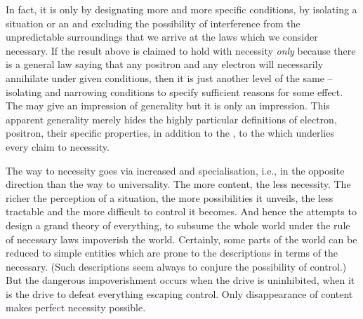 In fact, it is only by designating more and more specific conditions, by
isolating a situation or an  and excluding the possibility of
interference from the unpredictable surroundings that we arrive at the laws
which we consider necessary. If the result above is claimed to hold with
necessity {\em only} because there is a general law saying that any positron and
any electron will necessarily annihilate under given conditions, then it is just
another level of the same -- isolating and narrowing conditions to specify
sufficient reasons for some effect.  The  may give an impression of
generality but it is only an impression. This apparent generality merely hides
the highly particular definitions of electron, positron, their specific
properties, in addition to the , to the  which underlies every claim to necessity.

The way to necessity goes via increased  and specialisation, i.e.,
in the opposite direction than the way to universality.  The more content, the
less necessity. The richer the perception of a situation, the more
possibilities it unveils, the less tractable and the more difficult to control
it becomes.  And hence the attempts to design a grand theory of everything, to
subsume the whole world under the rule of necessary laws impoverish the world.
Certainly, some parts of the world can be reduced to simple entities which are
prone to the descriptions in terms of the necessary. (Such descriptions seem
always to conjure the possibility of control.) 
But the dangerous impoverishment occurs when the drive is uninhibited, when it
is the drive to defeat everything escaping control.  Only disappearance of
content makes perfect necessity possible.


